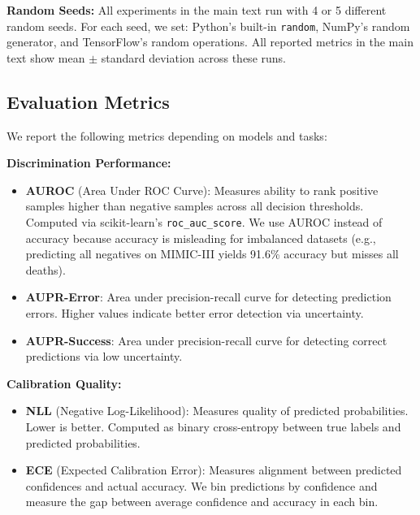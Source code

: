 \documentclass{article}
\theoremstyle{plain}
\theoremstyle{definition}
\theoremstyle{remark}
\begin{document}
\textbf{Random Seeds:} All experiments in the main text run with 4  or 5 different random seeds. For each seed, we set: Python's built-in \texttt{random}, NumPy's random generator, and TensorFlow's random operations. All reported metrics in the main text show mean $\pm$ standard deviation across these runs.

\subsection{Evaluation Metrics}\label{app:metrics}

We report the following metrics depending on models and tasks:

\textbf{Discrimination Performance:}
\begin{itemize}
    \item \textbf{AUROC} (Area Under ROC Curve): Measures ability to rank positive samples higher than negative samples across all decision thresholds. Computed via scikit-learn's \texttt{roc\_auc\_score}. We use AUROC instead of accuracy because accuracy is misleading for imbalanced datasets (e.g., predicting all negatives on MIMIC-III yields 91.6\% accuracy but misses all deaths).
    
    \item \textbf{AUPR-Error}: Area under precision-recall curve for detecting prediction errors. Higher values indicate better error detection via uncertainty.
    
    \item \textbf{AUPR-Success}: Area under precision-recall curve for detecting correct predictions via low uncertainty.
\end{itemize}

\textbf{Calibration Quality:}
\begin{itemize}
    \item \textbf{NLL} (Negative Log-Likelihood): Measures quality of predicted probabilities. Lower is better. Computed as binary cross-entropy between true labels and predicted probabilities.
    
    \item \textbf{ECE} (Expected Calibration Error): Measures alignment between predicted confidences and actual accuracy. We bin predictions by confidence and measure the gap between average confidence and accuracy in each bin.
\end{itemize}
\end{document}
